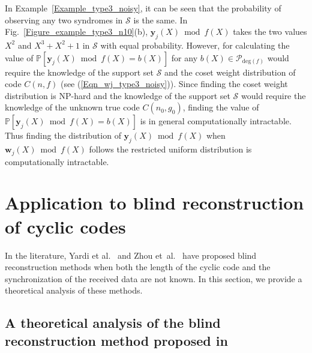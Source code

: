 \documentclass[10pt,journal]{IEEEtran}
\def \deg{{\mathrm{deg}}}
\def \Fig {Fig.}
\begin{document}
% 
In Example~\ref{Example_type3_noisy}, it can be seen that the probability of observing any two syndromes in $\mathcal{S}$ is the same.
In \Fig~\ref{Figure_example_type3_n10}(b), $\mathbf{y}_j(X) \bmod f(X)$ takes the two values $X^2$ and $X^3+X^2+1$ in $\mathcal{S}$
with equal probability.
% 
However, for calculating the value of $\mathbb{P}[\mathbf{y}_j(X) \bmod f(X) = b(X)]$ for any $b(X) \in \mathcal{P}_{\deg(f)}$
would require the knowledge of the support set $\mathcal{S}$ and the coset weight distribution of code $C(n,f)$ (see (\ref{Eqn_wj_type3_noisy})). 
Since finding the coset weight distribution is NP-hard and the knowledge of the support set $\mathcal{S}$ 
would require the knowledge of the unknown true code $C(n_0,g_0)$,
finding the value of $\mathbb{P}[\mathbf{y}_j(X) \bmod f(X) = b(X)]$ is in general computationally intractable.
Thus finding the distribution of $\mathbf{y}_j(X) \bmod f(X)$ when $\mathbf{w}_j(X) \bmod f(X)$ follows
the restricted uniform distribution is computationally intractable.



% 
\section{Application to blind reconstruction of cyclic codes}
\label{Section_Blind_Reconstruction_cyclic_structure}

In the literature, Yardi et al.~\cite{TCOMM_2016} and Zhou et~al.~\cite{Zhou2013_Entropy_new, Zhou2013_Entropy} have proposed
blind reconstruction methods when both the length of the cyclic code and the synchronization of the received data are not known. 
% 
In this section, we provide a theoretical analysis of these methods.

\subsection{A theoretical analysis of the blind reconstruction method proposed in \cite{TCOMM_2016}}
\end{document}

